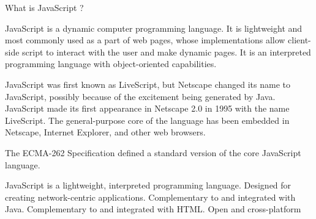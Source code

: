 What is JavaScript ?

JavaScript is a dynamic computer programming language. 
It is lightweight and most commonly used as a part of web pages, 
whose implementations allow client-side script to interact with the user and make dynamic pages. 
It is an interpreted programming language with object-oriented capabilities.

JavaScript was first known as LiveScript, but Netscape changed its name to JavaScript, 
possibly because of the excitement being generated by Java. JavaScript made its first appearance 
in Netscape 2.0 in 1995 with the name LiveScript. The general-purpose core of the language has been 
embedded in Netscape, Internet Explorer, and other web browsers.

The ECMA-262 Specification defined a standard version of the core JavaScript language.

JavaScript is a lightweight, interpreted programming language.
Designed for creating network-centric applications.
Complementary to and integrated with Java.
Complementary to and integrated with HTML.
Open and cross-platform